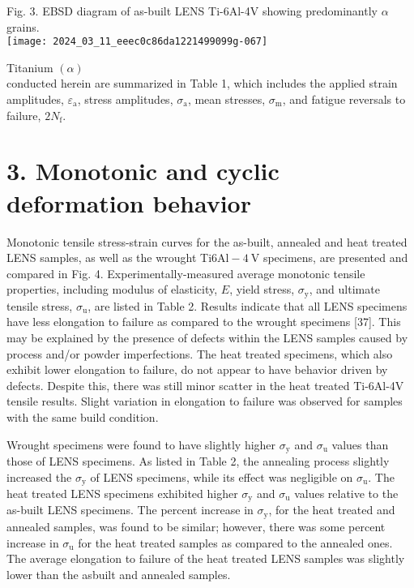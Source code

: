 \documentclass[10pt]{article}
\begin{document}
Fig. 3. EBSD diagram of as-built LENS Ti-6Al-4V showing predominantly $\alpha$ grains.\\
\texttt{[image: 2024\_03\_11\_eeec0c86da1221499099g-067]}

Titanium $(\alpha)$\\
conducted herein are summarized in Table 1, which includes the applied strain amplitudes, $\varepsilon_{\mathrm{a}}$, stress amplitudes, $\sigma_{\mathrm{a}}$, mean stresses, $\sigma_{\mathrm{m}}$, and fatigue reversals to failure, $2 N_{\mathrm{f}}$.

\section*{3. Monotonic and cyclic deformation behavior}
Monotonic tensile stress-strain curves for the as-built, annealed and heat treated LENS samples, as well as the wrought Ti$6 \mathrm{Al}-4 \mathrm{~V}$ specimens, are presented and compared in Fig. 4. Experimentally-measured average monotonic tensile properties, including modulus of elasticity, $E$, yield stress, $\sigma_{\mathrm{y}}$, and ultimate tensile stress, $\sigma_{\mathrm{u}}$, are listed in Table 2. Results indicate that all LENS specimens have less elongation to failure as compared to the wrought specimens [37]. This may be explained by the presence of defects within the LENS samples caused by process and/or powder imperfections. The heat treated specimens, which also exhibit lower elongation to failure, do not appear to have behavior driven by defects. Despite this, there was still minor scatter in the heat treated Ti-6Al-4V tensile results. Slight variation in elongation to failure was observed for samples with the same build condition.

Wrought specimens were found to have slightly higher $\sigma_{\mathrm{y}}$ and $\sigma_{\mathrm{u}}$ values than those of LENS specimens. As listed in Table 2, the annealing process slightly increased the $\sigma_{\mathrm{y}}$ of LENS specimens, while its effect was negligible on $\sigma_{\mathrm{u}}$. The heat treated LENS specimens exhibited higher $\sigma_{\mathrm{y}}$ and $\sigma_{\mathrm{u}}$ values relative to the as-built LENS specimens. The percent increase in $\sigma_{\mathrm{y}}$, for the heat treated and annealed samples, was found to be similar; however, there was some percent increase in $\sigma_{\mathrm{u}}$ for the heat treated samples as compared to the annealed ones. The average elongation to failure of the heat treated LENS samples was slightly lower than the asbuilt and annealed samples.
\end{document}
